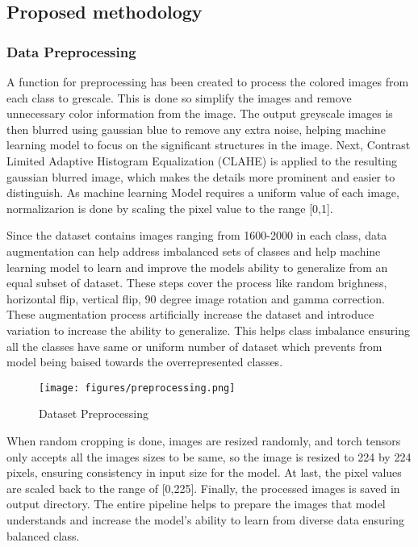 \subsection{Proposed methodology}


\subsubsection{Data Preprocessing}
A function for preprocessing has been created to process the colored images from each class to grescale. This is done so simplify the images and
remove unnecessary color information from the image. The output greyscale images is then blurred using gaussian blue to remove any extra noise,
helping machine learning model to focus on the significant structures in the image. Next, Contrast Limited Adaptive Histogram Equalization (CLAHE)
is applied to the resulting gaussian blurred image, which  makes the details more prominent and easier to distinguish. As machine learning Model
requires a uniform value of each image, normalizarion is done by scaling the pixel value to the range [0,1].


Since the dataset contains images ranging from 1600-2000 in each class, data augmentation can help address imbalanced sets of classes and help machine
learning model to learn and improve the models ability to generalize from an equal subset of dataset. These steps cover the process like random
brighness, horizontal flip, vertical flip, 90 degree image rotation and gamma correction. These augmentation process artificially increase the
dataset and introduce variation to increase the ability to generalize. This helps class imbalance ensuring all the classes have same or uniform
number of dataset which prevents from model being baised towards the overrepresented classes. \\
\begin{figure}[h]
    \centering
    \texttt{[image: figures/preprocessing.png]}
    \captionsetup{labelsep=colon, justification=centering, labelfont=bf}
    \caption{Dataset Preprocessing}
\end{figure}

When random cropping is done, images are resized randomly, and torch tensors only accepts all the images sizes to be same, so the image is resized to 224 by 224 pixels, ensuring
consistency in input size for the model. At last, the pixel values are scaled back to the range of [0,225]. Finally, the processed images is saved in
output directory. The entire pipeline helps to prepare the images that model understands and increase the model's ability to learn from diverse
data ensuring balanced class.

